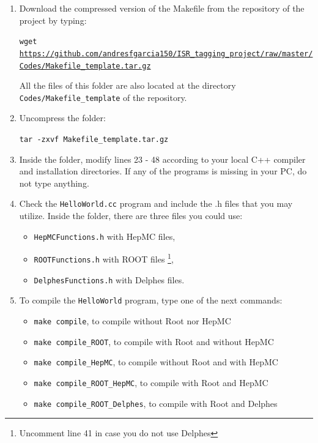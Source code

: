 \documentclass[12pt, oneside]{book}              %
\begin{document}
\begin{enumerate}
\item Download the compressed version of the Makefile from the repository
of the project by typing:

\texttt{wget \url{https://github.com/andresfgarcia150/ISR_tagging_project/raw/master/Codes/Makefile_template.tar.gz}}

All the files of this folder are also located at the directory \\
\texttt{Codes/Makefile\_template} of the repository.

\item Uncompress the folder:

\texttt{tar -zxvf Makefile\_template.tar.gz}

\item Inside the folder, modify lines 23 - 48 according to your local C++
compiler and installation directories. If any of the programs is missing 
in your PC, do not type anything.

\item Check the \texttt{HelloWorld.cc} program and include the .h files
that you may utilize. Inside the folder, there are three files you could use:

\begin{itemize}
\item \texttt{HepMCFunctions.h} with HepMC files,
\item \texttt{ROOTFunctions.h} with ROOT files \footnote{Uncomment line
 41 in case you do not use Delphes},
\item \texttt{DelphesFunctions.h} with Delphes files.
\end{itemize}

\item To compile the \texttt{HelloWorld} program, type one of 
the next commands:

\begin{itemize}
\item \texttt{make compile},                    to compile without Root nor HepMC
\item \texttt{make compile\_ROOT},              to compile with Root and without HepMC
\item \texttt{make compile\_HepMC},             to compile without Root and with HepMC
\item \texttt{make compile\_ROOT\_HepMC},       to compile with Root and HepMC
\item \texttt{make compile\_ROOT\_Delphes},     to compile with Root and Delphes
\end{itemize}

\end{enumerate}
\end{document}
